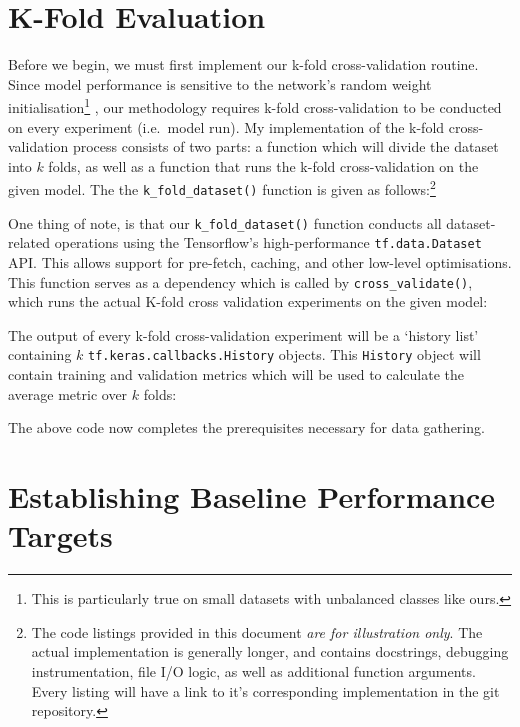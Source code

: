 \section{K-Fold Evaluation}

Before we begin, we must first implement our k-fold cross-validation routine. Since model performance is sensitive to the network's random weight initialisation\footnote{This is particularly true on small datasets with unbalanced classes like ours.} \autocite{Narkhede2022}, our methodology requires k-fold cross-validation to be conducted on every experiment (i.e.\ model run). My implementation of the k-fold cross-validation process consists of two parts: a function which will divide the dataset into \(k\) folds, as well as a function that runs the k-fold cross-validation on the given model. The the \texttt{k_fold_dataset()} function is given as follows:\footnote{The code listings provided in this document \emph{are for illustration only}. The actual implementation is generally longer, and contains docstrings, debugging instrumentation, file I/O logic, as well as additional function arguments. Every listing will have a link to it's corresponding implementation in the git repository.}



\noindent
One thing of note, is that our \texttt{k_fold_dataset()} function conducts all dataset-related operations using the Tensorflow's high-performance \texttt{tf.data.Dataset} API. This allows support for pre-fetch, caching, and other low-level optimisations. This function serves as a dependency which is called by \texttt{cross_validate()}, which runs the actual K-fold cross validation experiments on the given model:



\noindent
The output of every k-fold cross-validation experiment will be a \enquote*{history list} containing \(k\) \texttt{tf.keras.callbacks.History} objects. This \texttt{History} object will contain training and validation metrics which will be used to calculate the average metric over \(k\) folds:




\noindent
The above code now completes the prerequisites necessary for data gathering.

\section{Establishing Baseline Performance Targets}


